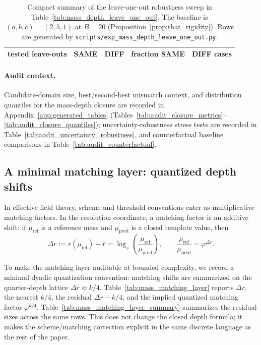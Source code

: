 \begin{table}[t]
\centering
\small
\setlength{\tabcolsep}{10pt}
\renewcommand{\arraystretch}{1.15}
\begin{tabular}{rrrrl}
\toprule
tested leave-outs & SAME & DIFF & fraction SAME & DIFF cases \\
\midrule
%
\end{tabular}
\caption{Compact summary of the leave-one-out robustness sweep in Table~\ref{tab:mass_depth_leave_one_out}. The baseline is $(a,b,c)=(2,5,1)$ at $B=20$ (Proposition~\ref{prop:rhat_rigidity}). Rows are generated by \texttt{scripts/exp\_mass\_depth\_leave\_one\_out.py}.}
\label{tab:mass_depth_leave_one_out_summary}
\end{table}

\paragraph{Audit context.}
Candidate-domain size, best/second-best mismatch context, and distribution quantiles for the mass-depth closure are recorded in Appendix~\ref{app:generated_tables} (Tables~\ref{tab:audit_closure_metrics}--\ref{tab:audit_closure_quantiles}); uncertainty-robustness stress tests are recorded in Table~\ref{tab:audit_uncertainty_robustness}, and counterfactual baseline comparisons in Table~\ref{tab:audit_counterfactual}.

\subsection{A minimal matching layer: quantized depth shifts}
\label{subsec:mass_matching_layer}

In effective field theory, scheme and threshold conventions enter as multiplicative matching factors.
In the resolution coordinate, a matching factor is an additive shift:
if $\mu_{\mathrm{ref}}$ is a reference mass and $\mu_{\mathrm{pred}}$ is a closed template value, then
\[
\Delta r:=r(\mu_{\mathrm{ref}})-\widehat r=\log_\varphi\!\left(\frac{\mu_{\mathrm{ref}}}{\mu_{\mathrm{pred}}}\right),
\qquad
\frac{\mu_{\mathrm{ref}}}{\mu_{\mathrm{pred}}}=\varphi^{\Delta r}.
\]

To make the matching layer auditable at bounded complexity, we record a minimal dyadic quantization convention:
matching shifts are summarized on the quarter-depth lattice $\Delta r\approx k/4$.
Table~\ref{tab:mass_matching_layer} reports $\Delta r$, the nearest $k/4$, the residual $\Delta r-k/4$, and the implied quantized matching factor $\varphi^{k/4}$.
Table~\ref{tab:mass_matching_layer_summary} summarizes the residual sizes across the same rows.
This does not change the closed depth formula; it makes the scheme/matching correction explicit in the same discrete language as the rest of the paper.

